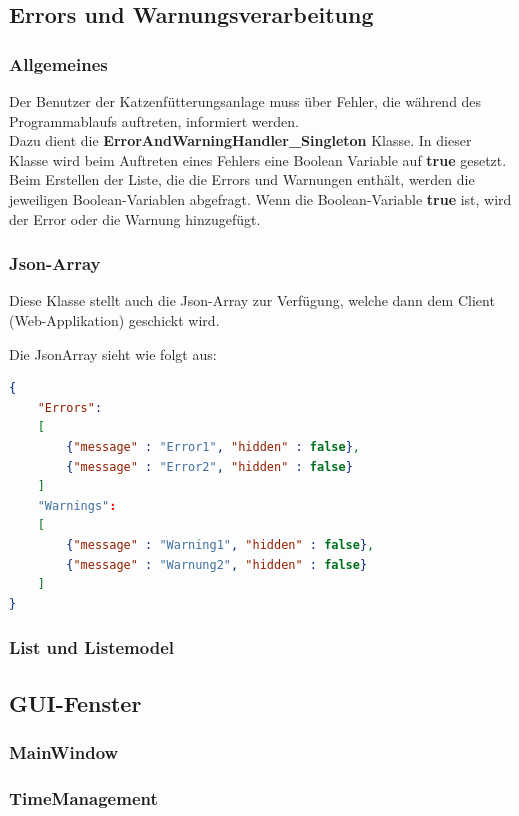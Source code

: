 \subsection{Errors und Warnungsverarbeitung}
\subsubsection{Allgemeines}
Der Benutzer der Katzenfütterungsanlage muss über Fehler, die während des Programmablaufs auftreten, informiert werden. 
\\ Dazu dient die \textbf{ErrorAndWarningHandler\_Singleton} Klasse. In dieser Klasse wird beim Auftreten eines Fehlers eine Boolean Variable auf \textbf{true} gesetzt. Beim Erstellen der Liste, die die Errors und Warnungen enthält, werden die jeweiligen Boolean-Variablen abgefragt. Wenn die Boolean-Variable \textbf{true} ist, wird der Error oder die Warnung hinzugefügt. 

\subsubsection{Json-Array} \label{subsubsec:Array}
Diese Klasse stellt auch die Json-Array zur Verfügung, welche dann dem Client (Web-Applikation) geschickt wird.

\newpage

Die JsonArray sieht wie folgt aus:

\begin{lstlisting}[language=json,firstnumber=1]
{ 
	"Errors": 
	[ 
		{"message" : "Error1", "hidden" : false}, 
		{"message" : "Error2", "hidden" : false} 
	] 
	"Warnings": 
	[ 
		{"message" : "Warning1", "hidden" : false}, 
		{"message" : "Warnung2", "hidden" : false} 
	] 
} 
\end{lstlisting}


\subsubsection{List und Listemodel}

\subsection{GUI-Fenster}
\subsubsection{MainWindow}
\subsubsection{TimeManagement}
